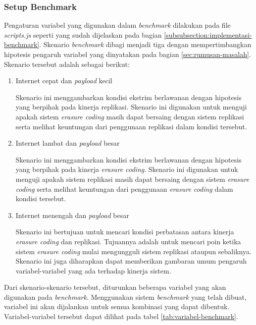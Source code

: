 \subsubsection{Setup Benchmark}
\label{subsubsection:setup-benchmark}

Pengaturan variabel yang digunakan dalam \textit{benchmark} dilakukan pada file \textit{scripts.js} seperti yang sudah dijelaskan pada bagian \ref{subsubsection:implementasi-benchmark}. Skenario \textit{benchmark} dibagi menjadi tiga dengan mempertimbangkan hipotesis pengaruh variabel yang dinyatakan pada bagian \ref{sec:rumusan-masalah}. Skenario tersebut adalah sebagai berikut:

\begin{enumerate}
  \item Internet cepat dan \textit{payload} kecil
  
  Skenario ini menggambarkan kondisi ekstrim berlawanan dengan hipotesis yang berpihak pada kinerja replikasi. Skenario ini digunakan untuk menguji apakah sistem \textit{erasure coding} masih dapat bersaing dengan sistem replikasi serta melihat keuntungan dari penggunaan replikasi dalam kondisi tersebut. 

  \item Internet lambat dan \textit{payload} besar
  
  Skenario ini menggambarkan kondisi ekstrim berlawanan dengan hipotesis yang berpihak pada kinerja \textit{erasure coding}. Skenario ini digunakan untuk menguji apakah sistem replikasi masih dapat bersaing dengan sistem \textit{erasure coding} serta melihat keuntungan dari penggunaan \textit{erasure coding} dalam kondisi tersebut.

  \item Internet menengah dan \textit{payload} besar
  
  Skenario ini bertujuan untuk mencari kondisi perbatasan antara kinerja \textit{erasure coding} dan replikasi. Tujuannya adalah untuk mencari poin ketika sistem \textit{erasure coding} mulai mengungguli sistem replikasi ataupun sebaliknya. Skenario ini juga diharapkan dapat memberikan gambaran umum pengaruh variabel-variabel yang ada terhadap kinerja sistem.
  
\end{enumerate}

Dari skenario-skenario tersebut, diturunkan beberapa variabel yang akan digunakan pada \textit{benchmark}. Menggunakan sistem \textit{benchmark} yang telah dibuat, variabel ini akan dijalankan untuk semua kombinasi yang dapat dibentuk. Variabel-variabel tersebut dapat dilihat pada tabel \ref{tab:variabel-benchmark}.

